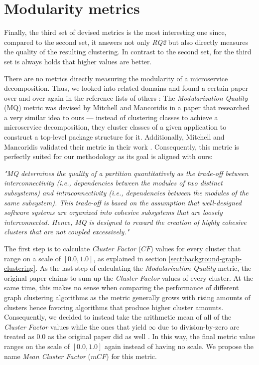 \documentclass[12pt,a4paper]{report}
\begin{document}
\section{Modularity metrics}

Finally, the third set of devised metrics is the most interesting one since,
compared to the second set, it answers not only \textit{RQ2} but also directly
measures the quality of the resulting clustering. In contrast to the second
set, for the third set is always holds that higher values are better.

There are no metrics directly measuring the modularity of a microservice
decomposition. Thus, we looked into related domains and found a certain paper
over and over again in the reference lists of others \cite{
maqbool2007hierarchical, praditwong2010software, tsantalis2009identification,
jiang2006visualizing}: The \textit{Modularization Quality} (MQ) metric was
devised by Mitchell and Mancoridis \cite{mitchell2006automatic} in a paper that
researched a very similar idea to ours --- instead of clustering classes to
achieve a microservice decomposition, they cluster classes of a given
application to construct a top\hyp level package structure for it.
Additionally, Mitchell and Mancoridis validated their metric in their work
\cite{mitchell2006automatic}. Consequently, this metric is perfectly suited for
our methodology as its goal is aligned with ours:
\begin{displayquote}
  \emph{
  "MQ determines the quality of a partition quantitatively as the trade-off
  between interconnectivity (i.e., dependencies between the modules of two
  distinct subsystems) and intraconnectivity (i.e., dependencies between the
  modules of the same subsystem). This trade-off is based on the assumption that
  well-designed software systems are organized into cohesive subsystems that are
  loosely interconnected. Hence, MQ is designed to reward the creation of highly
  cohesive clusters that are not coupled excessively."
  }~\cite{mitchell2006automatic}
\end{displayquote}

The first step is to calculate \textit{Cluster Factor} ($CF$) values for every
cluster that range on a scale of \([0.0, 1.0]\), as explained in section
\ref{sect:background-graph-clustering}. As the last step of calculating the
\textit{Modularization Quality} metric, the original paper claims to sum up the
\textit{Cluster Factor} values of every cluster. At the same time, this makes no sense
when comparing the performance of different graph clustering algorithms as the
metric generally grows with rising amounts of clusters hence favoring
algorithms that produce higher cluster amounts. Consequently, we decided to
instead take the arithmetic mean of all of the \textit{Cluster Factor} values
while the ones that yield $\infty$ due to division\hyp by\hyp zero are treated
as $0.0$ as the original paper did as well \cite{mitchell2006automatic}. In
this way, the final metric value ranges on the scale of \([0.0, 1.0]\) again
instead of having no scale. We propose the name \textit{Mean Cluster Factor}
($mCF$) for this metric.
\end{document}

